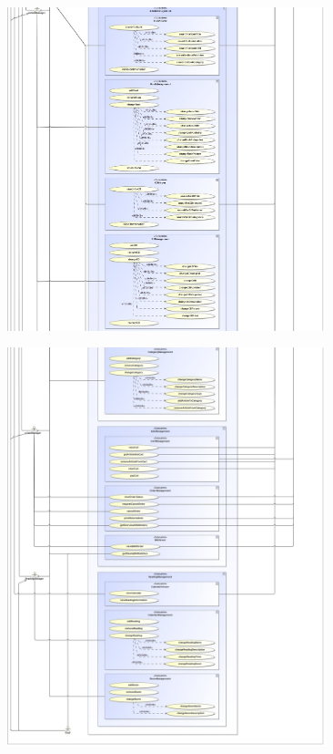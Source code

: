 \documentclass[a4paper]{article}
\begin{document}
\includegraphics[width=350px]{use-case-diagramm-part2.jpg}

\includegraphics[width=350px]{use-case-diagramm-part3.jpg}
\end{document}
